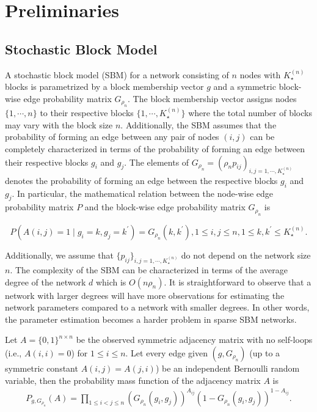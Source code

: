 \documentclass[11pt]{article}
\newcommand{\be}{\begin{eqnarray}}
\newcommand{\ee}{\end{eqnarray}}
\begin{document}
\section{Preliminaries}\label{prelim}
\subsection{Stochastic Block Model}
A stochastic block model (SBM) for a network consisting of $n$ nodes with $K_{\star}^{(n)}$ blocks is parametrized by a block membership vector $g$ and a symmetric block-wise edge probability matrix $G_{\rho_n}$. The block membership vector assigns nodes $\{1, \cdots, n \}$ to their respective blocks $\{1, \cdots, K_{\star}^{(n)} \}$ where the total number of blocks may vary with the block size $n$. 
Additionally, the SBM assumes that the probability of forming an edge between any pair of nodes $(i,j)$
can be completely characterized in terms of the probability of forming an edge between their respective blocks $g_i$ and $g_j$. The elements of $G_{\rho_n} = (\rho_n p_{ij})_{i,j =1, \cdots, K_{\star}^{(n)}}$ denotes the probability of forming an edge between the respective blocks $g_i$ and $g_j$. In particular, the mathematical relation between the node-wise edge probability matrix $P$ and the block-wise edge probability matrix $G_{\rho_n}$ is 

$$
P( A(i,j) =1 \mid g_i = k, g_j = k^{'} ) = G_{\rho_n}(k, k^{'}), 1 \le i,j \le n, 1 \le k, k^{'} \le K_{\star}^{(n)}.
$$

Additionally, we assume that $\{ p_{ij} \}_{i,j=1,\cdots, K_{\star}^{(n)} }$ do not depend on the network size $n$. The complexity of the SBM can be characterized in terms of the average degree of the network $d$ which is $O(n \rho_n)$. It is straightforward to observe that a network with larger degrees will have more observations for estimating the network parameters compared to a network with smaller degrees. In other words, the parameter estimation becomes a harder problem in sparse SBM networks.

Let $A = \{0,1\}^{n \times n}$ be the observed symmetric adjacency matrix with no self-loops (i.e., $A(i,i) =0$) for $1 \le i \le n$. Let every edge given $(g, G_{\rho_n})$ (up to a symmetric constant $A(i,j) = A(j,i)$) be an independent Bernoulli random variable, then the probability mass function of the adjacency matrix $A$ is
\be
P_{g, G_{\rho_n}}(A) = \prod_{1 \le i <j \le n} (G_{\rho_n}(g_i, g_j))^{A_{ij}} (1 - G_{\rho_n}(g_i,g_j))^{1 - A_{ij}}.
\ee
\end{document}
